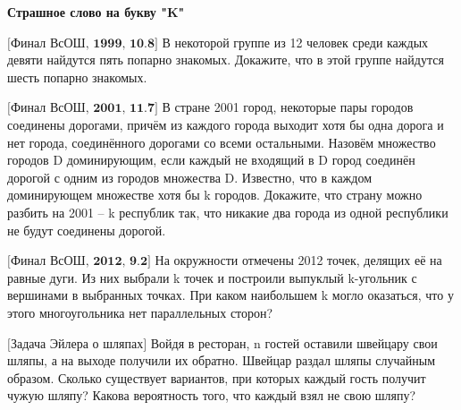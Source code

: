 \hspace{3mm}

\centerline{\bf \Huge Страшное слово на букву "K"}

\begin{flushright}
    \scriptsize{}
\end{flushright}

$\bigl[\textbf{Финал ВсОШ, 1999, 10.8}\bigr]$
В некоторой группе из 12 человек среди каждых девяти найдутся пять попарно знакомых. Докажите, что в этой группе найдутся шесть попарно знакомых.

$\bigl[\textbf{Финал ВсОШ, 2001, 11.7}\bigr]$
В стране 2001 город, некоторые пары городов соединены дорогами, причём из каждого города выходит хотя бы одна дорога и нет города, соединённого дорогами со всеми остальными. Назовём множество городов D доминирующим, если каждый не входящий в D город соединён дорогой с одним из городов множества D. Известно, что в каждом доминирующем множестве хотя бы k городов. Докажите, что страну можно разбить на  2001 – k  республик так, что никакие два города из одной республики не будут соединены дорогой.

$\bigl[\textbf{Финал ВсОШ, 2012, 9.2}\bigr]$
На окружности отмечены 2012 точек, делящих её на равные дуги. Из них выбрали k точек и построили выпуклый k-угольник с вершинами
в выбранных точках. При каком наибольшем k могло оказаться, что у этого многоугольника нет параллельных сторон?

$\bigl[\textbf{Задача Эйлера о шляпах}\bigr]$
Войдя в ресторан, n гостей оставили швейцару свои шляпы, а на выходе получили их обратно. Швейцар раздал шляпы случайным образом. Сколько существует вариантов, при которых каждый гость получит чужую шляпу? Какова вероятность того, что каждый взял не свою шляпу?
